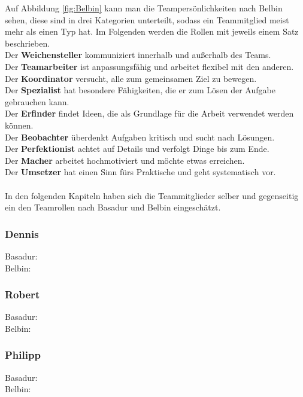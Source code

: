 \documentclass[a4paper,12pt,headsepline]{scrartcl}
\begin{document}
		Auf Abbildung \ref{fig:Belbin} kann man die Teampersönlichkeiten nach Belbin sehen, diese sind in drei Kategorien unterteilt, sodass ein Teammitglied meist mehr als einen Typ hat. Im Folgenden werden die Rollen mit jeweils einem Satz beschrieben.\\
		Der \textbf{Weichensteller} kommuniziert innerhalb und außerhalb des Teams.\\
		Der \textbf{Teamarbeiter} ist anpassungsfähig und arbeitet flexibel mit den anderen.\\
		Der \textbf{Koordinator} versucht, alle zum gemeinsamen Ziel zu bewegen.\\
		Der \textbf{Spezialist} hat besondere Fähigkeiten, die er zum Lösen der Aufgabe gebrauchen kann.\\
		Der \textbf{Erfinder} findet Ideen, die als Grundlage für die Arbeit verwendet werden können.\\
		Der \textbf{Beobachter} überdenkt Aufgaben kritisch und sucht nach Lösungen.\\
		Der \textbf{Perfektionist} achtet auf Details und verfolgt Dinge bis zum Ende.\\
		Der \textbf{Macher} arbeitet hochmotiviert und möchte etwas erreichen.\\
		Der \textbf{Umsetzer} hat einen Sinn fürs Praktische und geht systematisch vor.\\\\
		
		In den folgenden Kapiteln haben sich die Teammitglieder selber und gegenseitig ein den Teamrollen nach Basadur und Belbin eingeschätzt.
		\subsubsection{Dennis}
		Basadur: \\
		Belbin: 
		\subsubsection{Robert}
		Basadur: \\
		Belbin: 
		\subsubsection{Philipp}
		Basadur: \\
		Belbin: 
\end{document}
